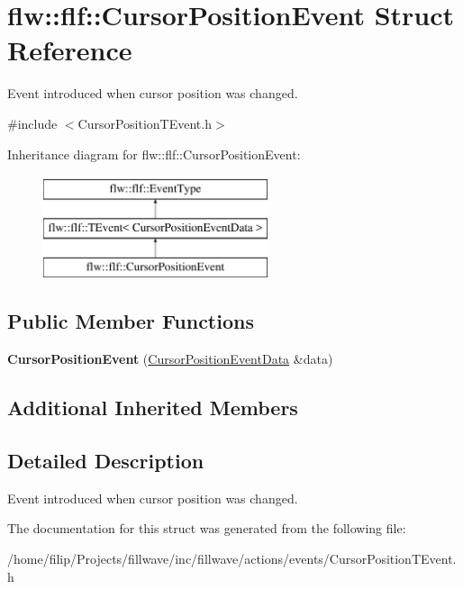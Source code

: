 \hypertarget{classflw_1_1flf_1_1CursorPositionEvent}{}\section{flw\+:\+:flf\+:\+:Cursor\+Position\+Event Struct Reference}
\label{classflw_1_1flf_1_1CursorPositionEvent}


Event introduced when cursor position was changed.  




{\ttfamily \#include $<$Cursor\+Position\+T\+Event.\+h$>$}

Inheritance diagram for flw\+:\+:flf\+:\+:Cursor\+Position\+Event\+:\begin{figure}[H]
\begin{center}
\leavevmode
\includegraphics[height=3.000000cm]{classflw_1_1flf_1_1CursorPositionEvent}
\end{center}
\end{figure}
\subsection*{Public Member Functions}
\begin{DoxyCompactItemize}
\item 
{\bfseries Cursor\+Position\+Event} (\hyperlink{structflw_1_1flf_1_1CursorPositionEventData}{Cursor\+Position\+Event\+Data} \&data)\hypertarget{classflw_1_1flf_1_1CursorPositionEvent_aa5a515d0f5f5ee64060c398c46d80f49}{}\label{classflw_1_1flf_1_1CursorPositionEvent_aa5a515d0f5f5ee64060c398c46d80f49}

\end{DoxyCompactItemize}
\subsection*{Additional Inherited Members}


\subsection{Detailed Description}
Event introduced when cursor position was changed. 

The documentation for this struct was generated from the following file\+:\begin{DoxyCompactItemize}
\item 
/home/filip/\+Projects/fillwave/inc/fillwave/actions/events/Cursor\+Position\+T\+Event.\+h\end{DoxyCompactItemize}
